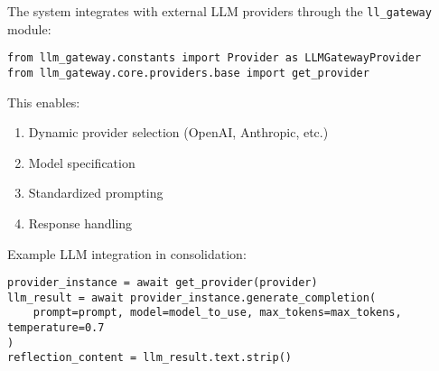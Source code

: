 \documentclass[12pt,a4paper]{article}
\newcommand{\code}[1]{\texttt{#1}}
\begin{document}
The system integrates with external LLM providers through the \code{ll\1\_gateway} module:
\begin{pageablecode}
\begin{verbatim}
from llm_gateway.constants import Provider as LLMGatewayProvider
from llm_gateway.core.providers.base import get_provider
\end{verbatim}
\end{pageablecode}
This enables:
\begin{enumerate}[label=\arabic*.]
    \item Dynamic provider selection (OpenAI, Anthropic, etc.)
    \item Model specification
    \item Standardized prompting
    \item Response handling
\end{enumerate}

Example LLM integration in consolidation:
\begin{pageablecode}
\begin{verbatim}
provider_instance = await get_provider(provider)
llm_result = await provider_instance.generate_completion(
    prompt=prompt, model=model_to_use, max_tokens=max_tokens, temperature=0.7
)
reflection_content = llm_result.text.strip()
\end{verbatim}
\end{pageablecode}
\end{document}
